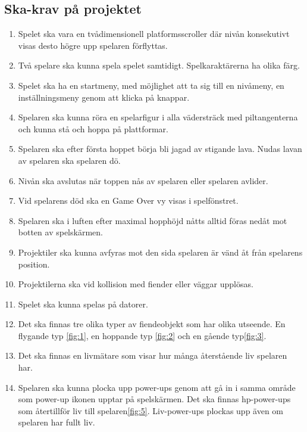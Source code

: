 \documentclass{TDP005mall}
\begin{document}
\subsection{Ska-krav på projektet}
\begin{enumerate}
\item Spelet ska vara en tvådimensionell platformsscroller där nivån konsekutivt visas desto högre upp spelaren förflyttas.
\item Två spelare ska kunna spela spelet samtidigt. Spelkaraktärerna ha olika färg.
\item Spelet ska ha en startmeny, med möjlighet att ta sig till en nivåmeny, en inställningsmeny genom att klicka på knappar.
\item Spelaren ska kunna röra en spelarfigur i alla vädersträck med piltangenterna och kunna stå och hoppa på plattformar.
\item Spelaren ska efter första hoppet börja bli jagad av stigande lava. Nudas lavan av spelaren ska spelaren dö.
\item Nivån ska avslutas när toppen nås av spelaren eller spelaren avlider.
\item Vid spelarens död ska en Game Over vy visas i spelfönstret.
\item Spelaren ska i luften efter maximal hopphöjd nåtts alltid föras nedåt mot botten av spelskärmen.
\item Projektiler ska kunna avfyras mot den sida spelaren är vänd åt från spelarens position.
\item Projektilerna ska vid kollision med fiender eller väggar upplösas.
\item Spelet ska kunna spelas på  datorer.
\item Det ska finnas tre olika typer av fiendeobjekt som har olika utseende. En flygande typ \ref{fig:1}, en hoppande typ \ref{fig:2} och en gående typ\ref{fig:3}.
\item Det ska finnas en livmätare som visar hur många återstående liv spelaren har.
\item Spelaren ska kunna plocka upp power-ups genom att gå in i samma område som power-up ikonen upptar på spelskärmen. Det ska finnas hp-power-ups som återtillför liv till spelaren\ref{fig:5}. Liv-power-ups plockas upp även om spelaren har fullt liv.
\end{enumerate}
\end{document}
